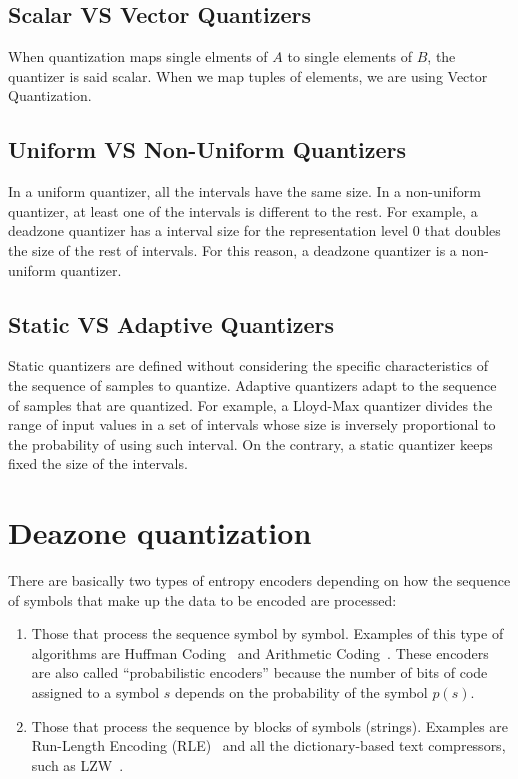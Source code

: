 \subsection{Scalar VS Vector Quantizers}

When quantization maps single elments of $A$ to single elements of
$B$, the quantizer is said scalar. When we map tuples of elements, we
are using Vector Quantization.

\subsection{Uniform VS Non-Uniform Quantizers}

In a uniform quantizer, all the intervals have the same size. In a
non-uniform quantizer, at least one of the intervals is different to
the rest. For example, a deadzone quantizer has a interval size for
the representation level 0 that doubles the size of the rest of
intervals. For this reason, a deadzone quantizer is a non-uniform
quantizer.

\subsection{Static VS Adaptive Quantizers}

Static quantizers are defined without considering the specific
characteristics of the sequence of samples to quantize. Adaptive
quantizers adapt to the sequence of samples that are quantized. For
example, a Lloyd-Max quantizer divides the range of input values in a
set of intervals whose size is inversely proportional to the
probability of using such interval. On the contrary, a static
quantizer keeps fixed the size of the intervals.

\section{Deazone quantization}



There are basically two types of entropy encoders depending on how the
sequence of symbols that make up the data to be encoded are processed:

\begin{enumerate}
\item Those that process the sequence symbol by symbol. Examples of
  this type of algorithms are Huffman
  Coding~\cite{vruiz__huffman_coding} and Arithmetic
  Coding~\cite{vruiz__arithmetic_coding}. These encoders are also
  called ``probabilistic encoders'' because the number of bits of code
  assigned to a symbol $s$ depends on the probability of the symbol
  $p(s)$.
\item Those that process the sequence by blocks of symbols
  (strings). Examples are Run-Length Encoding (RLE)~\cite{vruiz__rle}
  and all the dictionary-based text compressors, such as
  LZW~\cite{vruiz__LZW}.
\end{enumerate}
  
